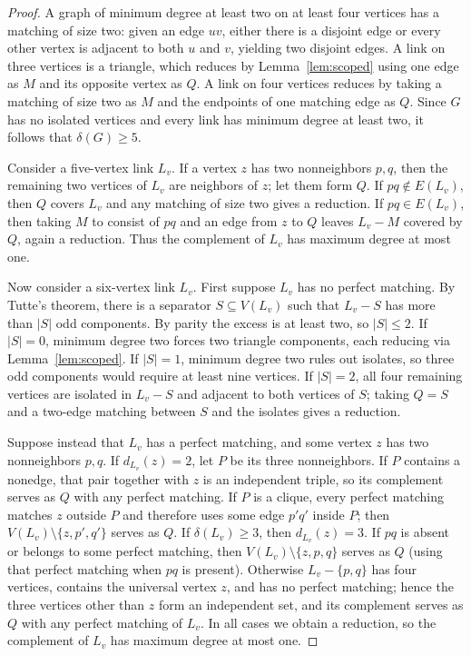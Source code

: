 \documentclass[11pt]{article}
\begin{document}
\begin{proof}
A graph of minimum degree at least two on at least four vertices has a matching of size two: given an edge $uv$, either there is a disjoint edge or every other vertex is adjacent to both $u$ and $v$, yielding two disjoint edges. A link on three vertices is a triangle, which reduces by Lemma~\ref{lem:scoped} using one edge as $M$ and its opposite vertex as $Q$. A link on four vertices reduces by taking a matching of size two as $M$ and the endpoints of one matching edge as $Q$. Since $G$ has no isolated vertices and every link has minimum degree at least two, it follows that $\delta(G)\geq 5$.

Consider a five-vertex link $L_v$. If a vertex $z$ has two nonneighbors $p,q$, then the remaining two vertices of $L_v$ are neighbors of $z$; let them form $Q$. If $pq\notin E(L_v)$, then $Q$ covers $L_v$ and any matching of size two gives a reduction. If $pq\in E(L_v)$, then taking $M$ to consist of $pq$ and an edge from $z$ to $Q$ leaves $L_v-M$ covered by $Q$, again a reduction. Thus the complement of $L_v$ has maximum degree at most one.

Now consider a six-vertex link $L_v$. First suppose $L_v$ has no perfect matching. By Tutte's theorem, there is a separator $S\subseteq V(L_v)$ such that $L_v-S$ has more than $|S|$ odd components. By parity the excess is at least two, so $|S|\leq 2$. If $|S|=0$, minimum degree two forces two triangle components, each reducing via Lemma~\ref{lem:scoped}. If $|S|=1$, minimum degree two rules out isolates, so three odd components would require at least nine vertices. If $|S|=2$, all four remaining vertices are isolated in $L_v-S$ and adjacent to both vertices of $S$; taking $Q=S$ and a two-edge matching between $S$ and the isolates gives a reduction.

Suppose instead that $L_v$ has a perfect matching, and some vertex $z$ has two nonneighbors $p,q$. If $d_{L_v}(z)=2$, let $P$ be its three nonneighbors. If $P$ contains a nonedge, that pair together with $z$ is an independent triple, so its complement serves as $Q$ with any perfect matching. If $P$ is a clique, every perfect matching matches $z$ outside $P$ and therefore uses some edge $p'q'$ inside $P$; then $V(L_v)\setminus\{z,p',q'\}$ serves as $Q$. If $\delta(L_v)\geq 3$, then $d_{L_v}(z)=3$. If $pq$ is absent or belongs to some perfect matching, then $V(L_v)\setminus\{z,p,q\}$ serves as $Q$ (using that perfect matching when $pq$ is present). Otherwise $L_v-\{p,q\}$ has four vertices, contains the universal vertex $z$, and has no perfect matching; hence the three vertices other than $z$ form an independent set, and its complement serves as $Q$ with any perfect matching of $L_v$. In all cases we obtain a reduction, so the complement of $L_v$ has maximum degree at most one.
\end{proof}
\end{document}
